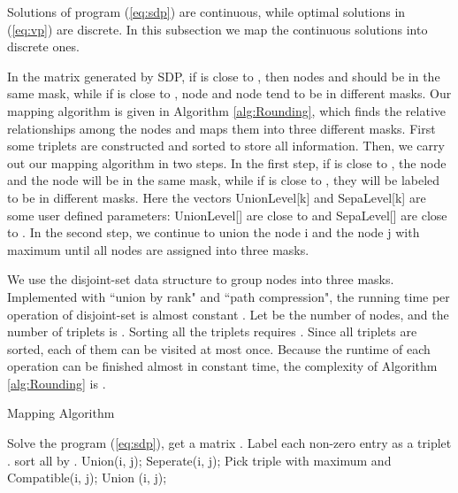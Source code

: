 \documentclass[10pt,conference]{IEEEtran}
\begin{document}
Solutions of program (\ref{eq:sdp}) are continuous, while optimal solutions in (\ref{eq:vp}) are discrete.
In this subsection we map the continuous solutions into discrete ones.

In the matrix  generated by SDP, if  is close to , then nodes  and  should be in the same mask, while if  is close to , node  and node  tend to be in different masks.
Our mapping algorithm is given in Algorithm \ref{alg:Rounding}, which finds the relative relationships among the nodes and maps them into three different masks.
First some triplets are constructed and sorted to store all  information.
Then, we carry out our mapping algorithm in two steps.
In the first step, if  is close to , the node  and the node  will be in the same mask, while if  is close to , they will be labeled to be in different masks.
Here the vectors UnionLevel[k] and SepaLevel[k] are some user defined parameters: UnionLevel[] are close to  and SepaLevel[] are close to .
In the second step, we continue to union the node i and the node j with maximum  until all nodes are assigned into three masks.

We use the disjoint-set data structure to group nodes into three masks. Implemented with ``union by rank" and ``path compression", the running time per operation of disjoint-set is almost constant \cite{book90Algorithm}. 
Let  be the number of nodes, and the number of triplets is .
Sorting all the triplets requires . 
Since all triplets are sorted, each of them can be visited at most once.
Because the runtime of each operation can be finished almost in constant time, the complexity of Algorithm \ref{alg:Rounding} is .

\begin{algorithm}[htb]
\caption{Mapping Algorithm} 
\label{alg:Rounding}
\begin{algorithmic}[1]
\STATE Solve the program (\ref{eq:sdp}), get a matrix .
	\STATE Label each non-zero entry  as a triplet .
	\STATE sort all  by .
				\STATE Union(i, j);
			\ENDIF
		\ENDFOR
				\STATE Seperate(i, j);
			\ENDIF
		\ENDFOR
	\ENDFOR
		\STATE Pick triple with maximum  and Compatible(i, j);
		\STATE Union (i, j);
	\ENDWHILE
\end{algorithmic}
\end{algorithm}
\end{document}
